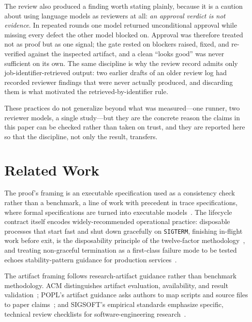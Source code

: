 \documentclass[11pt,letterpaper]{article}
\begin{document}
The review also produced a finding worth stating plainly, because it is a caution
about using language models as reviewers at all: \emph{an approval verdict is not
evidence}. In repeated rounds one model returned unconditional approval while
missing every defect the other model blocked on. Approval was therefore treated
not as proof but as one signal; the gate rested on blockers raised, fixed, and
re-verified against the inspected artifact, and a clean ``looks good'' was never
sufficient on its own. The same discipline is why the review record admits only
job-identifier-retrieved output: two earlier drafts of an older review log had
recorded reviewer findings that were never actually produced, and discarding them
is what motivated the retrieved-by-identifier rule.

These practices do not generalize beyond what was measured---one runner, two
reviewer models, a single study---but they are the concrete reason the claims in
this paper can be checked rather than taken on trust, and they are reported here so
that the discipline, not only the result, transfers.

\section{Related Work}

The proof's framing is an executable specification used as a consistency
check rather than a benchmark, a line of work with precedent in trace
specifications, where formal specifications are turned into executable
models~\cite{hoffman1988trace}. The lifecycle contract itself encodes
widely-recommended operational practice: disposable processes that start
fast and shut down gracefully on \texttt{SIGTERM}, finishing in-flight
work before exit, is the disposability principle of the twelve-factor
methodology~\cite{twelvefactor}, and treating non-graceful termination
as a first-class failure mode to be tested echoes stability-pattern
guidance for production services~\cite{nygard2018release}.

The artifact framing follows research-artifact guidance rather than
benchmark methodology. ACM distinguishes artifact evaluation,
availability, and result validation~\cite{acmBadging2020}; POPL's
artifact guidance asks authors to map scripts and source files to paper
claims~\cite{poplArtifact2023}; and SIGSOFT's empirical standards
emphasize specific, technical review checklists for software-engineering
research~\cite{sigsoftStandards,ralph2020empirical}.
\end{document}
